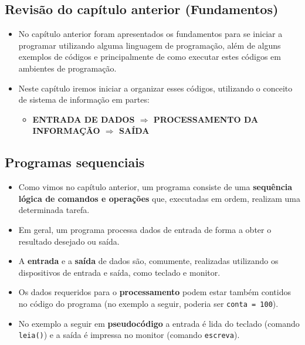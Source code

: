 \documentclass[12pt,a4paper]{article}
\providecommand{\tightlist}{%
      \setlength{\itemsep}{0pt}\setlength{\parskip}{0pt}}
\begin{document}
    \hypertarget{revisuxe3o-do-capuxedtulo-anterior-fundamentos}{%
\subsection{Revisão do capítulo anterior
(Fundamentos)}\label{revisuxe3o-do-capuxedtulo-anterior-fundamentos}}

    \begin{itemize}
\item
  No capítulo anterior foram apresentados os fundamentos para se iniciar
  a programar utilizando alguma linguagem de programação, além de alguns
  exemplos de códigos e principalmente de como executar estes códigos em
  ambientes de programação.
\item
  Neste capítulo iremos iniciar a organizar esses códigos, utilizando o
  conceito de sistema de informação em partes:

  \begin{itemize}
  \tightlist
  \item
    \textbf{ENTRADA DE DADOS \(\Rightarrow\) PROCESSAMENTO DA INFORMAÇÃO
    \(\Rightarrow\) SAÍDA}
  \end{itemize}
\end{itemize}

    \hypertarget{programas-sequenciais}{%
\subsection{Programas sequenciais}\label{programas-sequenciais}}

    \begin{itemize}
\item
  Como vimos no capítulo anterior, um programa consiste de uma
  \textbf{sequência lógica de comandos e operações} que, executadas em
  ordem, realizam uma determinada tarefa.
\item
  Em geral, um programa processa dados de entrada de forma a obter o
  resultado desejado ou saída.
\item
  A \textbf{entrada} e a \textbf{saída} de dados são, comumente,
  realizadas utilizando os dispositivos de entrada e saída, como teclado
  e monitor.
\item
  Os dados requeridos para o \textbf{processamento} podem estar também
  contidos no código do programa (no exemplo a seguir, poderia ser
  \texttt{conta\ =\ 100}).
\item
  No exemplo a seguir em \textbf{pseudocódigo} a entrada é lida do
  teclado (comando \texttt{leia()}) e a saída é impressa no monitor
  (comando \texttt{escreva}).
\end{itemize}
\end{document}
